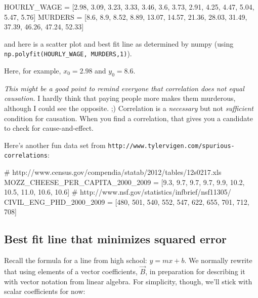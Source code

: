 \documentclass[titlepage]{tufte-book}
\begin{document}
\begin{fullwidth}
\begin{pyverbatim}
HOURLY_WAGE = [2.98, 3.09, 3.23, 3.33, 3.46, 3.6, 3.73, 2.91, 4.25, 4.47, 5.04, 5.47, 5.76]
MURDERS = [8.6, 8.9, 8.52, 8.89, 13.07, 14.57, 21.36, 28.03, 31.49, 37.39, 46.26, 47.24, 52.33]
\end{pyverbatim}

\noindent and here is a scatter plot and best fit line as determined by numpy (using {\tt\footnotesize np.polyfit(HOURLY\_WAGE, MURDERS,1)}).


\noindent Here, for example, $x_0 = 2.98$ and $y_0 = 8.6$.

{\em This might be a good point to remind everyone that correlation does not equal causation.}  I hardly think that paying people more makes them murderous, although I could see the opposite. ;)  Correlation is a {\em necessary} but not {\em sufficient} condition for causation. When you find a correlation, that gives you a candidate to check for cause-and-effect.

Here's another fun data set from {\tt\small http://www.tylervigen.com/spurious-correlations}:

\begin{pyverbatim}
# http://www.census.gov/compendia/statab/2012/tables/12s0217.xls
MOZZ_CHEESE_PER_CAPITA_2000_2009 = [9.3, 9.7, 9.7, 9.7, 9.9, 10.2, 10.5, 11.0, 10.6, 10.6]
# http://www.nsf.gov/statistics/infbrief/nsf11305/
CIVIL_ENG_PHD_2000_2009          = [480, 501, 540, 552, 547, 622, 655, 701, 712, 708]
\end{pyverbatim}

\begin{center}
\end{center}

\subsection{Best fit line that minimizes squared error}

Recall the formula for a line from high school: $y = m x + b$.  We normally rewrite that using elements of a vector coefficients, $\vec{B}$, in preparation for describing it with vector notation from linear algebra. For simplicity,  though, we'll stick with scalar coefficients for now:


\end{fullwidth}
\end{document}
